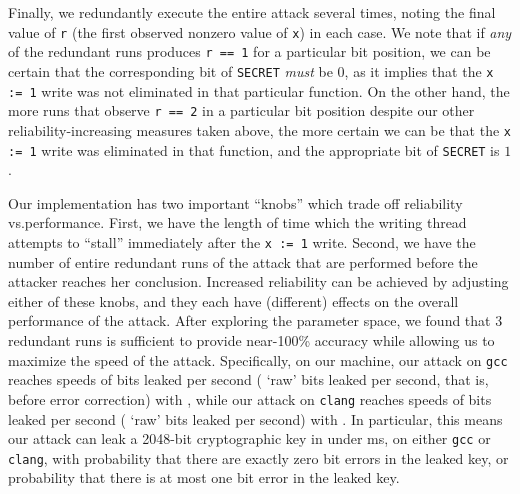 Finally, we redundantly execute the entire attack several times, noting the
final value of \verb|r| (the first observed nonzero value of \verb|x|) in each
case.
We note that if \emph{any} of the redundant runs produces \verb|r == 1| for a
particular bit position, we can be certain that the corresponding bit of
\verb|SECRET| \emph{must} be $0$, as it implies that the \verb|x := 1| write
was not eliminated in that particular function.
On the other hand, the more runs that observe \verb|r == 2| in a particular bit
position despite our other reliability-increasing measures taken above, the
more certain we can be that the \verb|x := 1| write was eliminated in that
function, and the appropriate bit of \verb|SECRET| is $1$.

Our implementation has two important ``knobs'' which trade off reliability
vs.\@ performance.
First, we have the length of time which the writing thread attempts to
``stall'' immediately after the \verb|x := 1| write.
Second, we have the number of entire redundant runs of the attack that are
performed before the attacker reaches her conclusion.
Increased reliability can be achieved by adjusting either of these knobs,
and they each have (different) effects on the overall performance of the
attack.
After exploring the parameter space, we found that $3$ redundant runs is
sufficient to provide near-100\% accuracy while allowing us to maximize the
speed of the attack.
Specifically, on our machine, our attack on \verb|gcc| reaches speeds of
 bits leaked per second
( `raw' bits leaked per second, that is, before
error correction) with , while our attack on
\verb|clang| reaches speeds of  bits leaked per
second ( `raw' bits leaked per second) with
.
In particular, this means our attack can leak a 2048-bit cryptographic key in
under  ms, on either \verb|gcc| or \verb|clang|, with
probability  that there are exactly zero bit errors in
the leaked key, or probability  that there is at most
one bit error in the leaked key.
